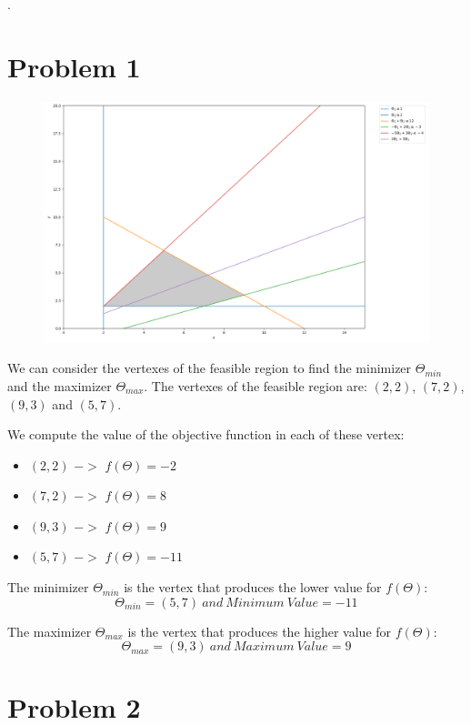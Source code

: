 \documentclass[12pt,letterpaper]{article}
\begin{document}
.

\section*{Problem 1}

\begin{figure}[H]
\centering
  \includegraphics[width=0.8\linewidth]{Ex1.png}
\end{figure}

We can consider the vertexes of the feasible region to find the minimizer $\Theta_{min}$ and the maximizer $\Theta_{max}$.
The vertexes of the feasible region are: $(2,2)$, $(7,2)$, $(9,3)$ and $(5,7)$.

We compute the value of the objective function in each of these vertex:

\begin{itemize}
\item $(2,2)$ $->$ $f(\Theta) = -2$
\item $(7,2)$ $->$ $f(\Theta) = 8$
\item $(9,3)$ $->$ $f(\Theta) = 9$
\item $(5,7)$ $->$ $f(\Theta) = -11$
\end{itemize} 

The minimizer $\Theta_{min}$ is the vertex that produces the lower value for $f(\Theta)$: 
$$\Theta_{min} = (5,7) \ and\ Minimum\ Value = -11$$

The maximizer $\Theta_{max}$ is the vertex that produces the higher value for $f(\Theta)$: 
$$\Theta_{max} = (9,3) \ and\ Maximum\ Value = 9$$


\section*{Problem 2}
\end{document}
